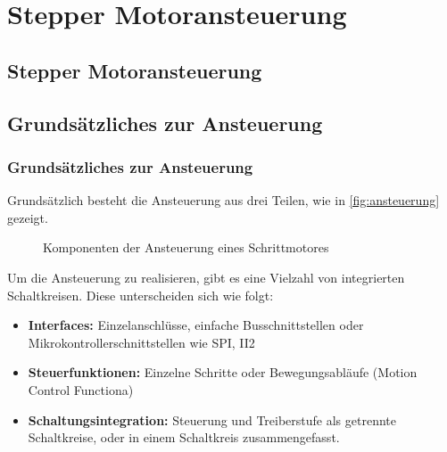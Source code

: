 \ifSTANDALONE
\section{Stepper Motoransteuerung}
\fi
\ifEMBED
\subsection{Stepper Motoransteuerung}
\fi

\ifEMBED
    \BLDCcollab
\fi
    \ifSTANDALONE
    \subsection{Grundsätzliches zur Ansteuerung}\label{subsec:Ansteuerung}
    \fi
    \ifEMBED
    \subsubsection{Grundsätzliches zur Ansteuerung}\label{subsec:Ansteuerung}
    \fi
    	Grundsätzlich besteht die Ansteuerung aus drei Teilen, wie in \autoref*{fig:ansteuerung} gezeigt. 
    	\begin{figure}[h!]
    		\centering
    		\caption{Komponenten der Ansteuerung eines Schrittmotores}
    		\label{fig:ansteuerung}
    	\end{figure}
        Um die Ansteuerung zu realisieren, gibt es eine Vielzahl von integrierten Schaltkreisen. Diese unterscheiden sich wie folgt: 
        \begin{itemize}
        	\item \textbf{Interfaces:} Einzelanschlüsse, einfache Busschnittstellen oder Mikrokontrollerschnittstellen wie SPI, II2
        	\item \textbf{Steuerfunktionen:} Einzelne Schritte oder Bewegungsabläufe (Motion Control Functiona)
        	\item \textbf{Schaltungsintegration:} Steuerung und Treiberstufe als getrennte Schaltkreise, oder in einem Schaltkreis zusammengefasst. 
        \end{itemize}
        \cite{Doku:Stepper} 
        
